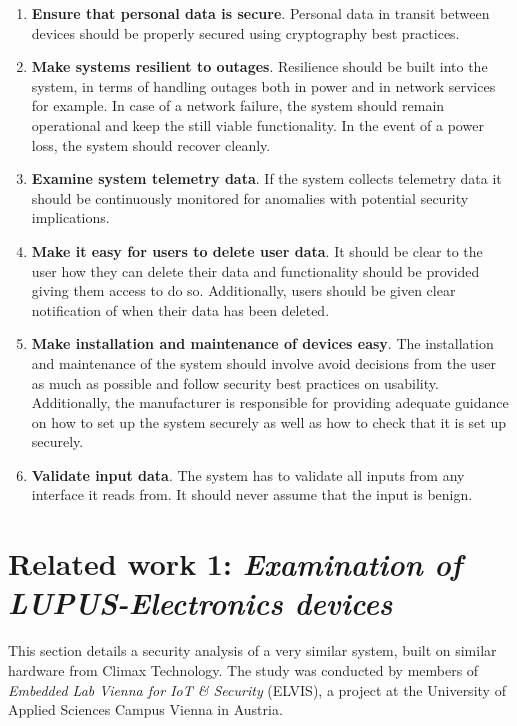 \begin{enumerate}
    \item \textbf{Ensure that personal data is secure}. Personal data in transit between devices should be properly secured using cryptography best practices.
    
    \item \textbf{Make systems resilient to outages}. Resilience should be built into the system, in terms of handling outages both in power and in network services for example. In case of a network failure, the system should remain operational and keep the still viable functionality. In the event of a power loss, the system should recover cleanly.
    
    \item \textbf{Examine system telemetry data}. If the system collects telemetry data it should be continuously monitored for anomalies with potential security implications.
    
    \item \textbf{Make it easy for users to delete user data}. It should be clear to the user how they can delete their data and functionality should be provided giving them access to do so. Additionally, users should be given clear notification of when their data has been deleted.
    
    \item \textbf{Make installation and maintenance of devices easy}. The installation and maintenance of the system should involve avoid decisions from the user as much as possible and follow security best practices on usability. Additionally, the manufacturer is responsible for providing adequate guidance on how to set up the system securely as well as how to check that it is set up securely.
    
    \item \textbf{Validate input data}. The system has to validate all inputs from any interface it reads from. It should never assume that the input is benign.
\end{enumerate}

\section{Related work 1: \textit{Examination of LUPUS-Electronics devices}} \label{ch:related-work:lupus}
This section details a security analysis of a very similar system, built on similar hardware from Climax Technology. The study was conducted by members of \textit{Embedded Lab Vienna for IoT \& Security} (ELVIS), a project at the University of Applied Sciences Campus Vienna in Austria.

